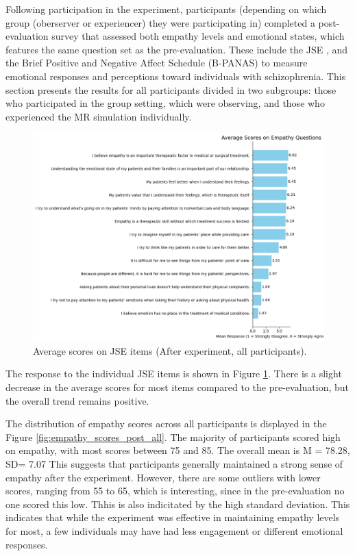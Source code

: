 Following participation in the experiment, participants (depending on which group (oberserver or experiencer) they were participating in) completed a post-evaluation survey that assessed both empathy levels and emotional states, which features the same question set as the pre-evaluation. These include the JSE \cite{Hojat2002}, and the Brief Positive and Negative Affect Schedule (B-PANAS) \cite{Boiroux2024} to measure emotional responses and perceptions toward individuals with schizophrenia. This section presents the results for all participants divided in two subgroups: those who participated in the group setting, which were observing, and those who experienced the MR simulation individually.

\vspace{1em}

\begin{figure}[htbp]
\centering
\includegraphics[width=\columnwidth]{../../Figures/avg_scores_post_all.png}
\caption{Average scores on JSE items (After experiment, all participants).}
\label{fig:avg_scores_post_all}
\end{figure}

 The response to the individual JSE items is shown in Figure \ref{fig:avg_scores_post_all}. There is a slight decrease in the average scores for most items compared to the pre-evaluation, but the overall trend remains positive. 

\vspace{1em}

The distribution of empathy scores across all participants is displayed in the Figure \ref{fig:empathy_scores_post_all}. The majority of participants scored high on empathy, with most scores between 75 and 85. The overall mean is M = 78.28, SD= 7.07 This suggests that participants generally maintained a strong sense of empathy after the experiment. However, there are some outliers with lower scores, ranging from 55 to 65, which is interesting, since in the pre-evaluation no one scored this low. Thhis is also indicitated by the high standard deviation. This indicates that while the experiment was effective in maintaining empathy levels for most, a few individuals may have had less engagement or different emotional responses.

